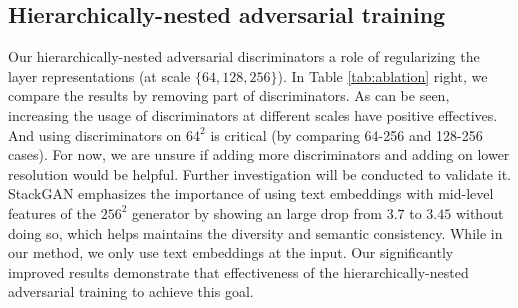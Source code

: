\documentclass[10pt,twocolumn,letterpaper]{article}
\begin{document}
\subsection{Hierarchically-nested adversarial training}
Our hierarchically-nested adversarial discriminators a role of regularizing the layer representations (at scale $\{64, 128, 256\}$). 
In Table \ref{tab:ablation} right, we compare the results by removing part of discriminators. 
As can be seen, increasing the usage of discriminators at different scales have positive effectives. And using discriminators on $64^2$ is critical (by comparing 64-256 and 128-256 cases). For now, we are unsure if adding more discriminators and adding on lower resolution would be helpful. Further investigation will be conducted to validate it.
StackGAN emphasizes the importance of using text embeddings with mid-level features of the $256^2$ generator by showing an large drop from $3.7$ to $3.45$ without doing so, which helps maintains the diversity and semantic consistency. While in our method, we only use text embeddings at the input. Our significantly improved results demonstrate that effectiveness of the hierarchically-nested adversarial training to achieve this goal. 
\end{document}
